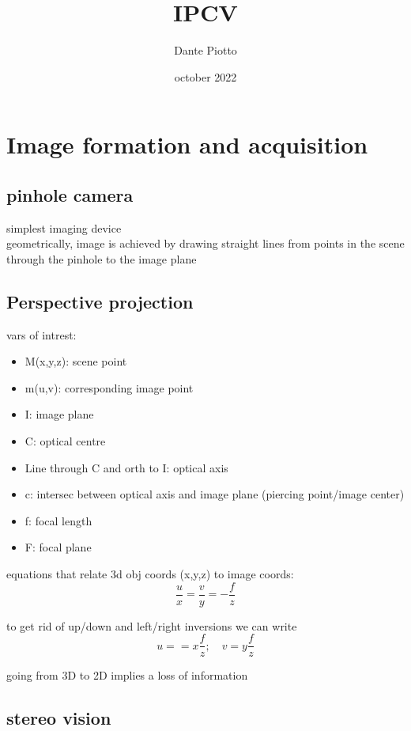 \documentclass{article}
\title{IPCV}
\author{Dante Piotto}
\date{october 2022}
\begin{document}
\maketitle
\tableofcontents
\newpage
\section{Image formation and acquisition}

\subsection{pinhole camera}
simplest imaging device\\
geometrically, image is achieved by drawing straight lines from points in the scene through the pinhole to the image plane

\subsection{Perspective projection}
vars of intrest:
\begin{itemize}
	\item M(x,y,z): scene point
	\item m(u,v): corresponding image point
	\item I: image plane
	\item C: optical centre
	\item Line through C and orth to I: optical axis
	\item c: intersec between optical axis and image plane (piercing point/image center)
	\item f: focal length
	\item F: focal plane
\end{itemize}

equations that relate 3d obj coords (x,y,z) to image coords:
\begin{equation}
	\frac{u}{x} = \frac{v}{y}=- \frac{f}{z}
\end{equation}

to get rid of up/down and left/right inversions we can write
\begin{equation}
		u= = x \frac{f}{z}; \quad v=y \frac{f}{z}
\end{equation}

going from 3D to 2D implies a loss of information

\subsection{stereo vision}
\end{document}
